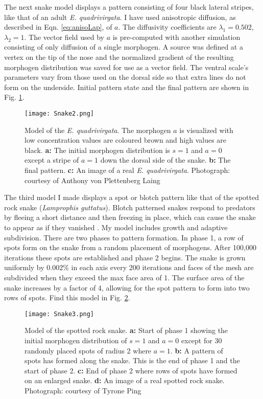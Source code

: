 The next snake model displays a pattern consisting of four black lateral stripes, like that of an adult \textit{E. quadrivirgata}. I have used anisotropic diffusion, as described in Eqn. \ref{eq:anisoLap}, of $a$. The diffusivity coefficients are $\lambda_{1}=0.502$, $\lambda_{2}=1$. The vector field used by $a$ is pre-computed with another simulation consisting of only diffusion of a single morphogen. A source was defined at a vertex on the tip of the nose and the normalized gradient of the resulting morphogen distribution was saved for use as a vector field. The ventral scale's parameters vary from those used on the dorsal side so that extra lines do not form on the underside. Initial pattern state and the final pattern are shown in Fig. \ref{fig:Snake2}.

\begin{figure}[ht]
	\centering
	\texttt{[image: Snake2.png]}
	\caption{Model of the \textit{E. quadrivirgata}. The morphogen $a$ is visualized with low concentration values are coloured brown and high values are black. \textbf{a:} The initial morphogen distribution is $s=1$ and $a=0$ except a stripe of $a=1$ down the dorsal side of the snake. \textbf{b:} The final pattern. \textbf{c:} An image of a real \textit{E. quadrivirgata}. \textcolor{citation-gray}{Photograph: courtesy of Anthony von Plettenberg Laing}}
	\label{fig:Snake2}
\end{figure}

\newpage
The third model I made displays a spot or blotch pattern like that of the spotted rock snake (\textit{Lamprophis guttatus}). Blotch patterned snakes respond to predators by fleeing a short distance and then freezing in place, which can cause the snake to appear as if they vanished \citep{lillywhite2014}. 
My model includes growth and adaptive subdivision. There are two phases to pattern formation. In phase 1, a row of spots form on the snake from a random placement of morphogens. After 100,000 iterations these spots are established and phase 2 begins. The snake is grown uniformly by $0.002\%$ in each axis every 200 iterations and faces of the mesh are subdivided when they exceed the max face area of 1. The surface area of the snake increases by a factor of 4, allowing for the spot pattern to form into two rows of spots. Find this model in Fig. \ref{fig:Snake3}.

\begin{figure}[ht]
	\centering
	\texttt{[image: Snake3.png]}
	\caption{Model of the spotted rock snake. \textbf{a:} Start of phase 1 showing the initial morphogen distribution of $s=1$ and $a=0$ except for 30 randomly placed spots of radius 2 where $a=1$. \textbf{b:} A pattern of spots has formed along the snake. This is the end of phase 1 and the start of phase 2. \textbf{c:} End of phase 2 where rows of spots have formed on an enlarged snake. \textbf{d:} An image of a real spotted rock snake. \textcolor{citation-gray}{Photograph: courtesy of Tyrone Ping}}
	\label{fig:Snake3}
\end{figure}


